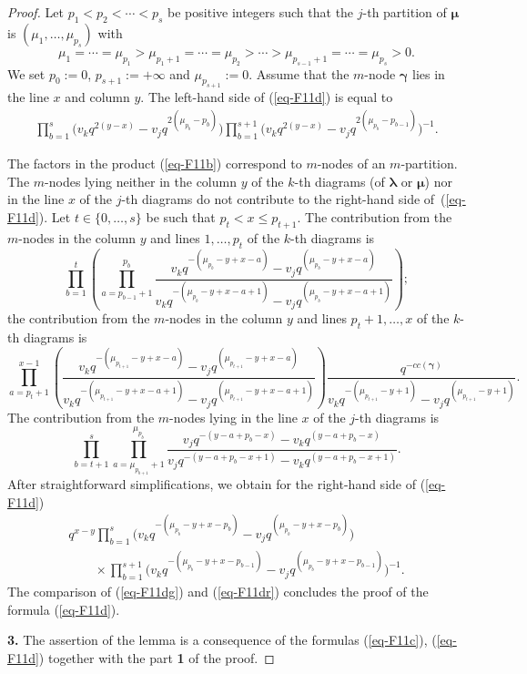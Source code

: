 \documentclass[11pt]{article}
\newcommand{\cc}{cc}
\newcommand{\lam}{\boldsymbol{\lambda}}
\newcommand{\mum}{\boldsymbol{\mu}}
\newcommand{\gam}{\boldsymbol{\gamma}}
\begin{document}
\begin{proof}
Let $p_1<p_2<\cdots<p_s$ be positive integers such that the $j$-th partition of $\mum$ is $(\mu_1,\dots,\mu_{p_s})$ with
\[
\mu_1=\cdots=\mu_{p_1}>\mu_{p_1+1}=\cdots=\mu_{p_2}>\cdots >\mu_{p_{s-1}+1}=\cdots=\mu_{p_s}>0  .
\]
We set $p_0:=0$, $p_{s+1}:=+\infty$ and $\mu_{p_{s+1}}:=0$.
Assume that the $m$-node $\gam$ lies in the line $x$ and column $y$.
The left-hand side of (\ref{eq-F11d}) is equal to
\begin{gather}\label{eq-F11dg}
\prod_{b=1}^s\big(v_kq^{2(y-x)}-v_jq^{2(\mu_{p_b}-p_b)}\big)  \prod_{b=1}^{s+1}\big(v_kq^{2(y-x)}-v_jq^{2(\mu_{p_b}-p_{b-1})}\big)^{-1} .
\end{gather}

The factors in the product (\ref{eq-F11b}) correspond to
$m$-nodes of an $m$-partition.
The $m$-nodes  lying neither in the column $y$ of the $k$-th diagrams (of $\lam$ or $\mum$) nor in the line $x$ of the $j$-th
diagrams do not contribute to the right-hand side of~(\ref{eq-F11d}).
Let $t\in\{0,\dots,s\}$ be such that $p_t<x\leq p_{t+1}$. The contribution from the $m$-nodes in the column $y$ and lines $1,\dots,p_t$ of the $k$-th diagrams is
\[
\prod_{b=1}^t\left(\prod_{a=p_{b-1}+1}^{p_b}\frac{v_kq^{-(\mu_{p_b}-y+x-a)}-v_jq^{(\mu_{p_b}-y+x-a)}}
{v_kq^{-(\mu_{p_b}-y+x-a+1)}-v_jq^{(\mu_{p_b}-y+x-a+1)}}\right);
\]
the contribution from the $m$-nodes in the column $y$ and lines $p_t+1,\dots,x$ of the $k$-th diagrams is
\[
\prod_{a=p_t+1}^{x-1}\left(\frac{v_kq^{-(\mu_{p_{t+1}}-y+x-a)}-v_jq^{(\mu_{p_{t+1}}-y+x-a)}}
{v_kq^{-(\mu_{p_{t+1}}-y+x-a+1)}-v_jq^{(\mu_{p_{t+1}}-y+x-a+1)}}\right) \frac{q^{-\cc(\gam)}}{v_kq^{-(\mu_{p_{t+1}}-y+1)}-v_jq^{(\mu_{p_{t+1}}-y+1)}} .
\]
The contribution from the $m$-nodes lying in the line $x$ of the $j$-th diagrams is
\[
\prod_{b=t+1}^s\prod_{a=\mu_{p_{b+1}}+1}^{\mu_{p_b}}\frac{v_jq^{-(y-a+p_b-x)}-v_kq^{(y-a+p_b-x)}}{v_jq^{-(y-a+p_b-x+1)}-v_kq^{(y-a+p_b-x+1)}} .
\]
After straightforward simplif\/ications, we obtain for the right-hand side of (\ref{eq-F11d})
\begin{gather}
q^{x-y}\prod_{b=1}^s\bigl(v_kq^{-(\mu_{p_b}-y+x-p_b)} -v_jq^{(\mu_{p_b}-y+x-p_b)}\bigr)\nonumber\\
\qquad {}\times \prod_{b=1}^{s+1}\bigl(v_kq^{-(\mu_{p_b}-y+x-p_{b-1})} -v_jq^{(\mu_{p_b}-y+x-p_{b-1})}\bigr)^{-1} .\label{eq-F11dr}
\end{gather}
The comparison of (\ref{eq-F11dg}) and (\ref{eq-F11dr}) concludes the proof of the formula (\ref{eq-F11d}).


 {\bf 3.} The assertion of the lemma is a consequence of the formulas (\ref{eq-F11c}),
 (\ref{eq-F11d}) together with the part {\bf 1} of the proof.
\end{proof}
\end{document}
